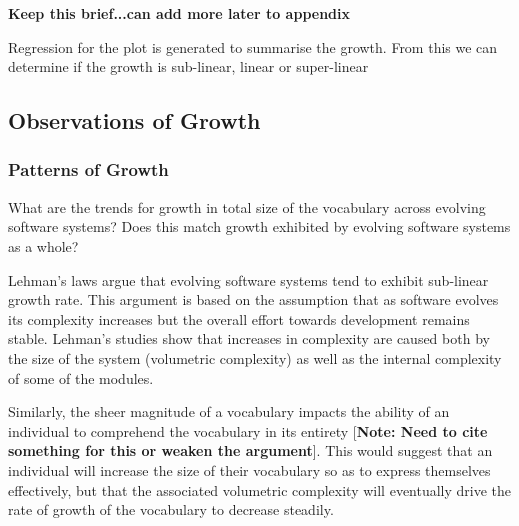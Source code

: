 
\crumbs
{
\textbf{Keep this brief...can add more later to appendix}

Regression for the plot is generated to summarise the growth. From this we can determine if the growth is sub-linear, linear or super-linear
}




\subsection{Observations of Growth} %
\label{sub:observations_of_growth}

\subsubsection{Patterns of Growth} %
\label{ssub:patterns_of_growth}

What are the trends for growth in total size of the vocabulary across evolving software systems? Does this match growth exhibited by evolving software systems as a whole?

Lehman's laws argue that evolving software systems tend to exhibit sub-linear growth rate.  This argument is based on the assumption that as software evolves its complexity increases but the overall effort towards development remains stable. Lehman's studies \cite{Lehman97a} show that increases in complexity are caused both by the size of the system (volumetric complexity) as well as the internal complexity of some of the modules.

Similarly, the sheer magnitude of a vocabulary impacts the ability of an individual to comprehend the vocabulary in its entirety [\textbf{Note: Need to cite something for this or weaken the argument}]. This would suggest that an individual will increase the size of their vocabulary so as to express themselves effectively, but that the associated volumetric complexity will eventually drive the rate of growth of the vocabulary to decrease steadily.

